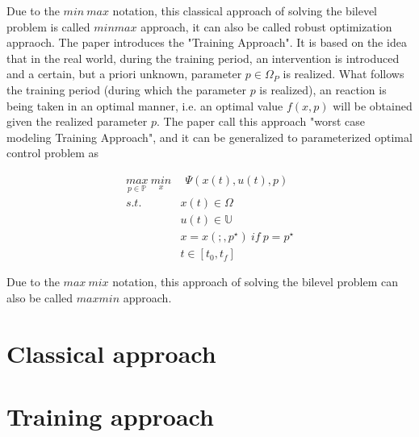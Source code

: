 \documentclass  [
  paper    = a4,
  BCOR     = 10mm,
  twoside,
  fontsize = 12pt,
  fleqn,
  toc      = bibnumbered,
  toc      = listofnumbered,
  numbers  = noendperiod,
  headings = normal,
  listof   = leveldown,
  version  = 3.03
]                                       {scrreprt}
\newcommand{\<}{\langle}
\renewcommand{\>}{\rangle}
\begin{document}
Due to the $min \ max$ notation, this classical approach of solving the bilevel problem is called $min max$ approach, it can also be called robust optimization appraoch. 
The paper \cite{MatSch22} introduces the "Training Approach".  It is based on the idea that in the real world, during the training period, an intervention is introduced and a certain, but a priori unknown, parameter $p \in \Omega_P$ is realized. What follows the training period (during which the parameter $p$ is realized), an reaction is being taken in an optimal manner, i.e. an optimal value $f(x,p)$ will be obtained given the realized parameter $p$. The paper \cite{MatSch22} call this approach "worst case modeling Training Approach", and it can be generalized to parameterized optimal control problem as 

\begin{equation}
	\begin{aligned}
		\underset{p \in \mathbb{P}}{max} \ \underset{x}{min} & \ \   \Psi(x(t), u(t), p) \\ 
		s.t.\ \  & x(t) \in \Omega \\
		& u(t) \in \mathbb{U}  \\
		& x = x(;,p^\star) \ if \ p = p^\star \\
		& t \in [t_0, t_f]
	\end{aligned}
	\label{P5_maxmin}
\end{equation}

Due to the $max \ mix$ notation, this approach of solving the bilevel problem can also be called $max min$ approach. 

\section{Classical approach}

\section{Training approach}
\end{document}
